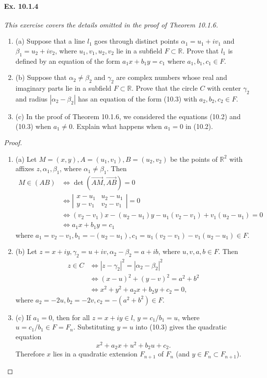 \documentclass[11pt,a4paper]{article}
\newcommand{\be} {\begin{enumerate}}
\newcommand{\ee} {\end{enumerate}}
\newcommand{\R}{\mathbb{R}}
\begin{document}
\paragraph{Ex. 10.1.4}

{\it This exercise covers the details omitted in the proof of Theorem 10.1.6.
\be
\item[(a)] Suppose that a line $l_1$ goes through distinct points $\alpha_1 = u_1+iv_1$ and $\beta_1 = u_2+iv_2$, where $u_1,v_1,u_2,v_2$ lie in a subfield $F \subset \R$. Prove that $l_1$ is defined by an equation of the form $a_1x +b_1y = c_1$ where $a_1,b_1,c_1 \in F$.
\item[(b)] Suppose that $\alpha_2 \ne \beta_2$ and $\gamma_2$ are complex numbers whose real and imaginary parts lie in a subfield $F\subset \R$. Prove that the circle $C$ with center $\gamma_2$ and radius $|\alpha_2-\beta_2|$ has an equation of the form (10.3) with $a_2,b_2,c_2 \in F$.
\item[(c)] In the proof of Theorem 10.1.6, we considered the equations (10.2) and (10.3) when $a_1\ne 0$. Explain what happens when $a_1 = 0$ in (10.2).
\ee
}

\begin{proof}
\be
\item[(a)]
 Let $M = (x,y),A = (u_1,v_1),B = (u_2,v_2)$ be the points of $\R^2$ with affixes $z,\alpha_1,\beta_1$, where $\alpha_1\ne \beta_1$.
Then 
\begin{align*}
M \in (AB) &\iff \det(\overrightarrow{AM}, \overrightarrow{AB}) = 0\\
&\iff
\left|
\begin{array}{ccc}
  x-u_1& u_2-u_1    \\
  y-v_1& v_2-v_1      
\end{array}
\right|
=0\\
&\iff (v_2-v_1)x - (u_2-u_1)y -u_1(v_2-v_1) +v_1 (u_2-u_1) = 0\\
&\iff a_1x+b_1y = c_1
\end{align*}
where $a_1 = v_2-v_1, b_1 = -(u_2-u_1), c_1 = u_1(v_2-v_1) - v_1(u_2-u_1) \in F$.
\item[(b)] Let $z = x+iy, \gamma_2 = u+iv, \alpha_2 - \beta_2 = a +ib$, where $u,v,a,b \in F$. Then
\begin{align*}
z \in C &\iff |z-\gamma_2|^2 = |\alpha_2-\beta_2|^2\\
&\iff(x-u)^2 + (y-v)^2 = a^2+b^2\\
&\iff x^2+y^2+a_2x+b_2y+c_2 = 0,
\end{align*}
where $a_2 = -2u,b_2 = -2v ,c_2 = -(a^2+b^2) \in F$.
\item[(c)] If $a_1 = 0$, then for all $z =x+iy \in l$, $y=c_1/b_1 = u$, where $u = c_1/b_1 \in F=F_n$. Substituting $y = u$ into (10.3) gives the quadratic equation
$$x^2+a_2x+u^2+b_2u+c_2.$$
Therefore $x$ lies in a quadratic extension $F_{n+1}$ of $F_n$ (and $y \in F_n \subset F_{n+1}$).
\ee
\end{proof}
\end{document}
